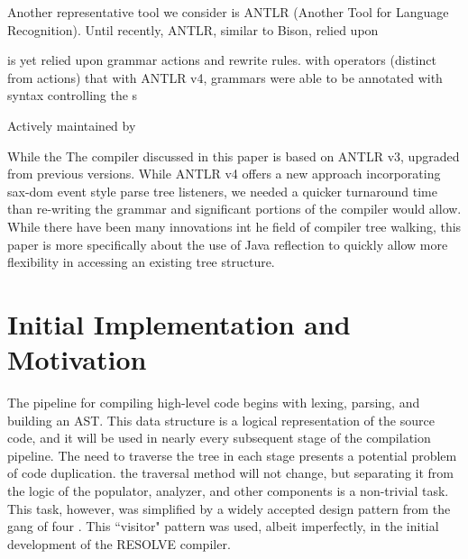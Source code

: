 \documentclass[times]{speauth}
\begin{document}

Another representative tool we consider is ANTLR (Another Tool for Language Recognition). Until recently, ANTLR, similar to Bison, relied upon 

is yet relied upon grammar actions and rewrite rules. with operators (distinct from actions) that  with ANTLR v4, grammars were able to be annotated with syntax controlling the s

Actively maintained by 

While the  The compiler discussed in this paper is based on ANTLR v3, upgraded from previous versions. While ANTLR v4 offers a new approach incorporating sax-dom event style parse tree listeners, we needed a quicker turnaround time than re-writing the grammar and significant portions of the compiler would allow. While there have been many innovations int he field of compiler tree walking, this paper is more specifically about the use of Java reflection to quickly allow more flexibility in accessing an existing tree structure.


\section{Initial Implementation and Motivation}
The pipeline for compiling high-level code begins with lexing, parsing, and building an AST. This data structure is a logical representation of the source code, and it will be used in nearly every subsequent stage of the compilation pipeline. The need to traverse the tree in each stage presents a potential problem of code duplication. the traversal method will not change, but separating it from the logic of the populator, analyzer, and other components is a non-trivial task. This task, however, was simplified by a widely accepted design pattern from the gang of four \cite{gamma:1995}. This ``visitor" pattern was used, albeit imperfectly, in the initial development of the RESOLVE compiler.
\end{document}
